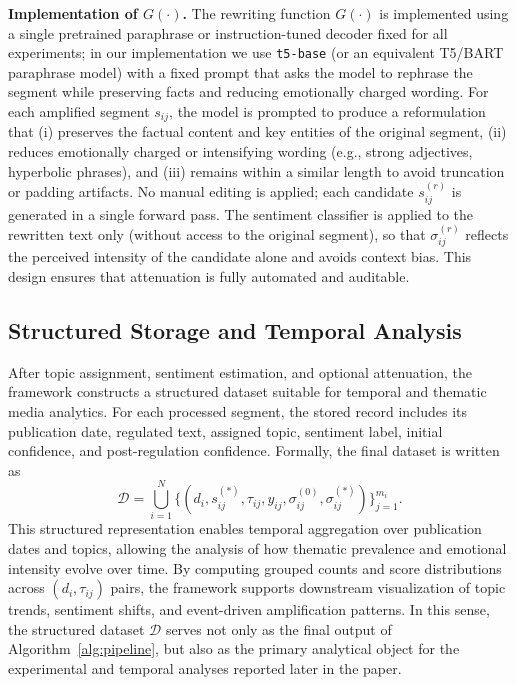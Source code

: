 \documentclass[final,1p,times]{elsarticle}
\begin{document}
\textbf{Implementation of $G(\cdot)$.} The rewriting function $G(\cdot)$ is implemented using a single pretrained paraphrase or instruction-tuned decoder fixed for all experiments; in our implementation we use \texttt{t5-base} (or an equivalent T5/BART paraphrase model) with a fixed prompt that asks the model to rephrase the segment while preserving facts and reducing emotionally charged wording. For each amplified segment $s_{ij}$, the model is prompted to produce a reformulation that (i) preserves the factual content and key entities of the original segment, (ii) reduces emotionally charged or intensifying wording (e.g., strong adjectives, hyperbolic phrases), and (iii) remains within a similar length to avoid truncation or padding artifacts. No manual editing is applied; each candidate $s^{(r)}_{ij}$ is generated in a single forward pass. The sentiment classifier is applied to the rewritten text only (without access to the original segment), so that $\sigma^{(r)}_{ij}$ reflects the perceived intensity of the candidate alone and avoids context bias. This design ensures that attenuation is fully automated and auditable.

\subsection{Structured Storage and Temporal Analysis}

After topic assignment, sentiment estimation, and optional attenuation, the framework constructs a structured dataset suitable for temporal and thematic media analytics. For each processed segment, the stored record includes its publication date, regulated text, assigned topic, sentiment label, initial confidence, and post-regulation confidence. Formally, the final dataset is written as
\begin{equation}
\mathcal{D} = \bigcup_{i=1}^{N} \{(d_i, s^{(*)}_{ij}, \tau_{ij}, y_{ij}, \sigma^{(0)}_{ij}, \sigma^{(*)}_{ij})\}_{j=1}^{m_i}.
\end{equation}
This structured representation enables temporal aggregation over publication dates and topics, allowing the analysis of how thematic prevalence and emotional intensity evolve over time. By computing grouped counts and score distributions across $(d_i,\tau_{ij})$ pairs, the framework supports downstream visualization of topic trends, sentiment shifts, and event-driven amplification patterns. In this sense, the structured dataset $\mathcal{D}$ serves not only as the final output of Algorithm~\ref{alg:pipeline}, but also as the primary analytical object for the experimental and temporal analyses reported later in the paper.
\end{document}
